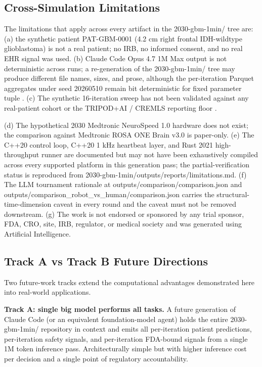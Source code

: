 \subsection{Cross-Simulation Limitations}
\label{sec:limits-cross}

The limitations that apply across every artifact in the
2030-gbm-1min/ tree are: (a) the synthetic patient PAT-GBM-0001
(4.2 cm right frontal IDH-wildtype glioblastoma) is not a real
patient; no IRB, no informed consent, and no real EHR signal was
used. (b) Claude Code Opus 4.7 1M Max output is not deterministic
across runs; a re-generation of the 2030-gbm-1min/ tree may produce
different file names, sizes, and prose, although the per-iteration
Parquet aggregates under seed 20260510 remain bit deterministic for
fixed parameter tuple \cite{claude-opus-47, claude-code}. (c) The
synthetic 16-iteration sweep has not been validated against any
real-patient cohort or the TRIPOD+AI / CREMLS reporting floor
\cite{Collins2024TRIPODAI, ElEmam2024CREMLS}. 

(d) The hypothetical
2030 Medtronic NeuroSpeed 1.0 hardware does not exist; the
comparison against Medtronic ROSA ONE Brain v3.0
\cite{rosa-one-brain, Lefranc2014ROSAStereotaxy} is paper-only.
(e) The C++20 control loop, C++20 1 kHz heartbeat layer, and Rust
2021 high-throughput runner are documented but may not have been
exhaustively compiled across every supported platform in this
generation pass; the partial-verification status is reproduced from
2030-gbm-1min/outputs/reports/limitations.md. (f) The LLM tournament
rationale at outputs/comparison/comparison.json and
outputs/comparison_robot_vs_human/comparison.json carries the
structural-time-dimension caveat in every round and the caveat must
not be removed downstream. (g) The work is not endorsed or sponsored
by any trial sponsor, FDA, CRO, site, IRB, regulator, or medical
society and was generated using Artificial Intelligence.


\subsection{Track A vs Track B Future Directions}
\label{sec:limits-tracks}

Two future-work tracks extend the computational advantages
demonstrated here into real-world applications.

\textbf{Track A: single big model performs all tasks.} A future
generation of Claude Code (or an equivalent foundation-model agent)
holds the entire 2030-gbm-1min/ repository in context and emits all
per-iteration patient predictions, per-iteration safety signals, and
per-iteration FDA-bound signals from a single 1M token inference
pass. Architecturally simple but with higher inference cost per
decision and a single point of regulatory accountability.

